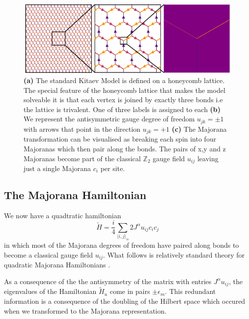 \begin{figure}
\hypertarget{fig:intro_figure_template}{%
\centering
\includegraphics[width=1\textwidth,height=\textheight]{figure_code/amk_chapter/honeycomb_zoom/intro_figure_template.pdf}
\caption{\textbf{(a)} The standard Kitaev Model is defined on a
honeycomb lattice. The special feature of the honeycomb lattice that
makes the model solveable it is that each vertex is joined by exactly
three bonds i.e the lattice is trivalent. One of three labels is
assigned to each \textbf{(b)} We represent the antisymmetric gauge
degree of freedom \(u_{jk} = \pm 1\) with arrows that point in the
direction \(u_{jk} = +1\) \textbf{(c)} The Majorana transformation can
be visualised as breaking each spin into four Majoranas which then pair
along the bonds. The pairs of x,y and z Majoranas become part of the
classical \(\mathbb{Z}_2\) gauge field \(u_{ij}\) leaving just a single
Majorana \(c_i\) per site.}\label{fig:intro_figure_template}
}
\end{figure}

\hypertarget{the-majorana-hamiltonian}{%
\subsection{The Majorana Hamiltonian}\label{the-majorana-hamiltonian}}

We now have a quadtratic hamiltonian
\[ \tilde{H} =  \frac{i}{4} \sum_{\langle i,j\rangle_\alpha} 2J^{\alpha} u_{ij} c_i c_j\]
in which most of the Majorana degrees of freedom have paired along bonds
to become a classical gauge field \(u_{ij}\). What follows is relatively
standard theory for quadratic Majorana Hamiltonians
\textcite{BlaizotRipka1986}.

As a consequence of the the antisymmetry of the matrix with entries
\(J^{\alpha} u_{ij}\), the eigenvalues of the Hamiltonian
\(\tilde{H}_u\) come in pairs \(\pm \epsilon_m\). This redundant
information is a consequence of the doubling of the Hilbert space which
occured when we transformed to the Majorana representation.

